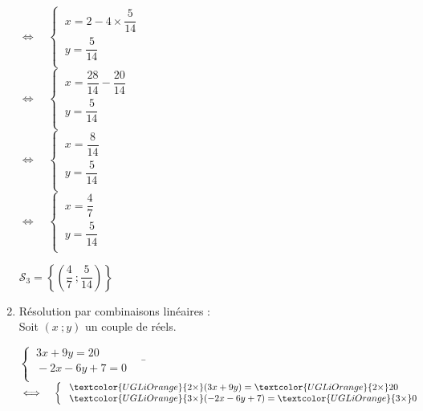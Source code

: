 \documentclass[a4paper,11pt,exos]{nsi} %
\begin{document}
\begin{enumerate}
\begin{tabbing}
                    \>  $\iff\quad \left\{
                        \begin{array}{l}
                            \ x=2-4\times \dfrac{5}{14} \\
                            \ y=\dfrac{5}{14} \\
                    \end{array} \right.$\\[.5em]

                    \>  $\iff\quad \left\{
                        \begin{array}{l}
                            \ x=\dfrac{28}{14}-\dfrac{20}{14} \\[.5em]
                            \ y=\dfrac{5}{14} \\
                    \end{array} \right.$\\[.5em]

                    \>  $\iff\quad \left\{
                        \begin{array}{l}
                            \ x=\dfrac{8}{14} \\[.5em]
                            \ y=\dfrac{5}{14} \\
                    \end{array} \right.$\\[.5em]

                    \>  $\iff\quad \left\{
                        \begin{array}{l}
                            \ x=\dfrac{4}{7}\\[.5em]
                            \ y=\dfrac{5}{14} \\
                    \end{array} \right.$
            \end{tabbing}
            $\mathcal{S}_3=\left\{\left(\dfrac{4}{7}\ ;\dfrac{5}{14}\right)\right\}$

            \item Résolution par combinaisons linéaires :\\
            Soit $(x\ ;y)$ un couple de réels.
                \begin{tabbing}
                    $\left\{
                        \begin{array}{l}
                            \ 3x+9y=20 \\
                            \ -2x-6y+7=0 \\
                        \end{array} \right. \quad$  \= $\iff\quad 
                        \left\{
                            \begin{array}{l}
                                \ \textcolor{UGLiOrange}{2\times}(3x+9y)=\textcolor{UGLiOrange}{2\times}20 \\
                                \ \textcolor{UGLiOrange}{3\times}(-2x-6y+7)=\textcolor{UGLiOrange}{3\times}0 \\
                        \end{array} \right.$\\[.5em]
            

\end{tabbing}
\end{enumerate}
\end{document}
